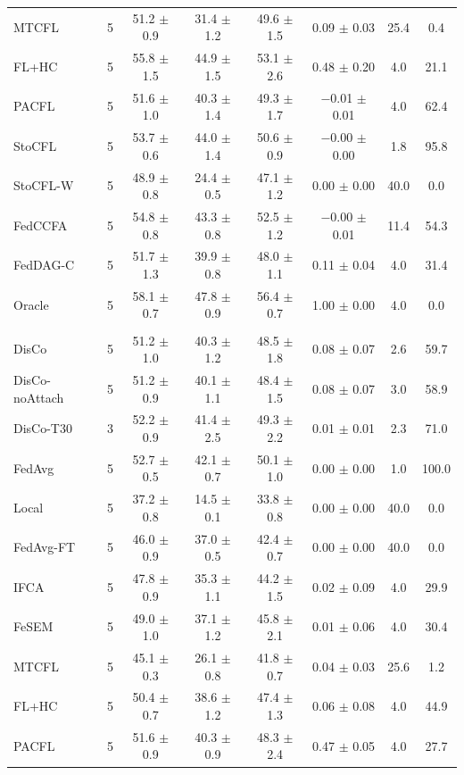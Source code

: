{{\begin{tabular}{l r c c c c c c}
MTCFL & 5 & 51.2 $\pm$ 0.9 & 31.4 $\pm$ 1.2 & 49.6 $\pm$ 1.5 & 0.09 $\pm$ 0.03 & 25.4 & 0.4 \\
FL+HC & 5 & 55.8 $\pm$ 1.5 & 44.9 $\pm$ 1.5 & 53.1 $\pm$ 2.6 & 0.48 $\pm$ 0.20 & 4.0 & 21.1 \\
PACFL & 5 & 51.6 $\pm$ 1.0 & 40.3 $\pm$ 1.4 & 49.3 $\pm$ 1.7 & $-$0.01 $\pm$ 0.01 & 4.0 & 62.4 \\
StoCFL & 5 & 53.7 $\pm$ 0.6 & 44.0 $\pm$ 1.4 & 50.6 $\pm$ 0.9 & $-$0.00 $\pm$ 0.00 & 1.8 & 95.8 \\
StoCFL-W & 5 & 48.9 $\pm$ 0.8 & 24.4 $\pm$ 0.5 & 47.1 $\pm$ 1.2 & 0.00 $\pm$ 0.00 & 40.0 & 0.0 \\
FedCCFA & 5 & 54.8 $\pm$ 0.8 & 43.3 $\pm$ 0.8 & 52.5 $\pm$ 1.2 & $-$0.00 $\pm$ 0.01 & 11.4 & 54.3 \\
FedDAG-C & 5 & 51.7 $\pm$ 1.3 & 39.9 $\pm$ 0.8 & 48.0 $\pm$ 1.1 & 0.11 $\pm$ 0.04 & 4.0 & 31.4 \\
Oracle & 5 & 58.1 $\pm$ 0.7 & 47.8 $\pm$ 0.9 & 56.4 $\pm$ 0.7 & 1.00 $\pm$ 0.00 & 4.0 & 0.0 \\
\addlinespace
\multicolumn{8}{l}{\textit{CIFAR-100 rotations}} \\
DisCo & 5 & 51.2 $\pm$ 1.0 & 40.3 $\pm$ 1.2 & 48.5 $\pm$ 1.8 & 0.08 $\pm$ 0.07 & 2.6 & 59.7 \\
DisCo-noAttach & 5 & 51.2 $\pm$ 0.9 & 40.1 $\pm$ 1.1 & 48.4 $\pm$ 1.5 & 0.08 $\pm$ 0.07 & 3.0 & 58.9 \\
DisCo-T30 & 3 & 52.2 $\pm$ 0.9 & 41.4 $\pm$ 2.5 & 49.3 $\pm$ 2.2 & 0.01 $\pm$ 0.01 & 2.3 & 71.0 \\
FedAvg & 5 & 52.7 $\pm$ 0.5 & 42.1 $\pm$ 0.7 & 50.1 $\pm$ 1.0 & 0.00 $\pm$ 0.00 & 1.0 & 100.0 \\
Local & 5 & 37.2 $\pm$ 0.8 & 14.5 $\pm$ 0.1 & 33.8 $\pm$ 0.8 & 0.00 $\pm$ 0.00 & 40.0 & 0.0 \\
FedAvg-FT & 5 & 46.0 $\pm$ 0.9 & 37.0 $\pm$ 0.5 & 42.4 $\pm$ 0.7 & 0.00 $\pm$ 0.00 & 40.0 & 0.0 \\
IFCA & 5 & 47.8 $\pm$ 0.9 & 35.3 $\pm$ 1.1 & 44.2 $\pm$ 1.5 & 0.02 $\pm$ 0.09 & 4.0 & 29.9 \\
FeSEM & 5 & 49.0 $\pm$ 1.0 & 37.1 $\pm$ 1.2 & 45.8 $\pm$ 2.1 & 0.01 $\pm$ 0.06 & 4.0 & 30.4 \\
MTCFL & 5 & 45.1 $\pm$ 0.3 & 26.1 $\pm$ 0.8 & 41.8 $\pm$ 0.7 & 0.04 $\pm$ 0.03 & 25.6 & 1.2 \\
FL+HC & 5 & 50.4 $\pm$ 0.7 & 38.6 $\pm$ 1.2 & 47.4 $\pm$ 1.3 & 0.06 $\pm$ 0.08 & 4.0 & 44.9 \\
PACFL & 5 & 51.6 $\pm$ 0.9 & 40.3 $\pm$ 0.9 & 48.3 $\pm$ 2.4 & 0.47 $\pm$ 0.05 & 4.0 & 27.7 \\

\end{tabular}}}
